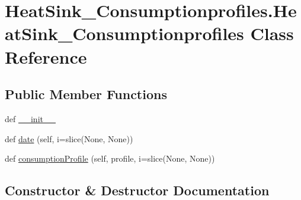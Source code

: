 \hypertarget{class_heat_sink___consumptionprofiles_1_1_heat_sink___consumptionprofiles}{}\section{Heat\+Sink\+\_\+\+Consumptionprofiles.\+Heat\+Sink\+\_\+\+Consumptionprofiles Class Reference}
\label{class_heat_sink___consumptionprofiles_1_1_heat_sink___consumptionprofiles}
\subsection*{Public Member Functions}
\begin{DoxyCompactItemize}
\item 
def \hyperlink{class_heat_sink___consumptionprofiles_1_1_heat_sink___consumptionprofiles_a0a98cfa6bb822aecb7b5b1f977def1f8}{\+\_\+\+\_\+init\+\_\+\+\_\+}
\item 
def \hyperlink{class_heat_sink___consumptionprofiles_1_1_heat_sink___consumptionprofiles_a5e52056f8f430a2aa642948af5246a2f}{date} (self, i=slice(None, None))
\item 
def \hyperlink{class_heat_sink___consumptionprofiles_1_1_heat_sink___consumptionprofiles_a62866d4ad34ff5cd3128356fd4996931}{consumption\+Profile} (self, profile, i=slice(None, None))
\end{DoxyCompactItemize}


\subsection{Constructor \& Destructor Documentation}
\mbox{\label{class_heat_sink___consumptionprofiles_1_1_heat_sink___consumptionprofiles_a0a98cfa6bb822aecb7b5b1f977def1f8}} 

